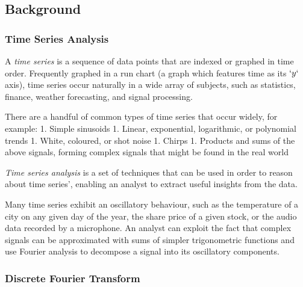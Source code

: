 \documentclass[
  english,
  paper=a4,
  oneside  ,captions=tableheading
]{scrbook}
\begin{document}
\hypertarget{background}{%
\subsection{Background}\label{background}}

\hypertarget{time-series-analysis}{%
\subsubsection{Time Series Analysis}\label{time-series-analysis}}

A \emph{time series} is a sequence of data points that are indexed or
graphed in time order. Frequently graphed in a run chart (a graph which
features time as its \(`y`\) axis), time series occur naturally in a
wide array of subjects, such as statistics, finance, weather
forecasting, and signal processing.

There are a handful of common types of time series that occur widely,
for example: 1. Simple sinusoids 1. Linear, exponential, logarithmic, or
polynomial trends 1. White, coloured, or shot noise 1. Chirps 1.
Products and sums of the above signals, forming complex signals that
might be found in the real world

\emph{Time series analysis} is a set of techniques that can be used in
order to reason about time series', enabling an analyst to extract
useful insights from the data.

Many time series exhibit an oscillatory behaviour, such as the
temperature of a city on any given day of the year, the share price of a
given stock, or the audio data recorded by a microphone. An analyst can
exploit the fact that complex signals can be approximated with sums of
simpler trigonometric functions and use Fourier analysis to decompose a
signal into its oscillatory components.

\hypertarget{discrete-fourier-transform}{%
\subsubsection{Discrete Fourier
Transform}\label{discrete-fourier-transform}}
\end{document}
